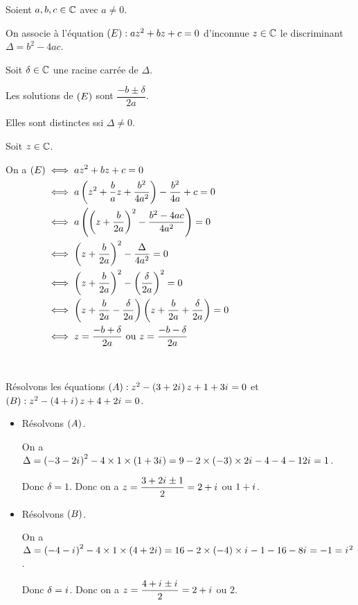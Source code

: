 \begin{prop}
Soient \(a,b,c\in\mathbb{C}\) avec \(a\not=0\).

On associe à l'équation \(\left(E\right):az^2+bz+c=0\) d'inconnue \(z\in\mathbb{C}\) le discriminant \(\Delta=b^2-4ac\).

Soit \(\delta\in\mathbb{C}\) une racine carrée de \(\Delta\).

Les solutions de \(\left(E\right)\) sont \(\dfrac{-b\pm\delta}{2a}\).

Elles sont distinctes ssi \(\Delta\not=0\).
\end{prop}

\begin{dem}
Soit \(z\in\mathbb{C}\).

On a \(\begin{aligned}[t]
\left(E\right)&\iff az^2+bz+c=0 \\
&\iff a\left(z^2+\dfrac{b}{a}z+\dfrac{b^2}{4a^2}\right)-\dfrac{b^2}{4a}+c=0 \\
&\iff a\left(\left(z+\dfrac{b}{2a}\right)^2-\dfrac{b^2-4ac}{4a^2}\right)=0 \\
&\iff\left(z+\dfrac{b}{2a}\right)^2-\dfrac{\Delta}{4a^2}=0 \\
&\iff\left(z+\dfrac{b}{2a}\right)^2-\left(\dfrac{\delta}{2a}\right)^2=0 \\
&\iff\left(z+\dfrac{b}{2a}-\dfrac{\delta}{2a}\right)\left(z+\dfrac{b}{2a}+\dfrac{\delta}{2a}\right)=0 \\
&\iff z=\dfrac{-b+\delta}{2a}\text{ ou }z=\dfrac{-b-\delta}{2a}
\end{aligned}\)

~
\end{dem}

\begin{ex}
Résolvons les équations \(\left(A\right):z^2-\left(3+2i\mkern1mu\right)z+1+3i\mkern1mu=0\) et \(\left(B\right):z^2-\left(4+i\mkern1mu\right)z+4+2i\mkern1mu=0\).

\begin{itemize}
\item Résolvons \(\left(A\right)\).

On a \(\Delta=\left(-3-2i\mkern1mu\right)^2-4\times1\times\left(1+3i\mkern1mu\right)=9-2\times\left(-3\right)\times2i\mkern1mu-4-4-12i\mkern1mu=1\).

Donc \(\delta=1\). Donc on a \(z=\dfrac{3+2i\mkern1mu\pm1}{2}=2+i\mkern1mu\) ou \(1+i\mkern1mu\).

\item Résolvons \(\left(B\right)\).

On a \(\Delta=\left(-4-i\mkern1mu\right)^2-4\times1\times\left(4+2i\mkern1mu\right)=16-2\times\left(-4\right)\times i\mkern1mu-1-16-8i\mkern1mu=-1=i\mkern1mu^2\).

Donc \(\delta=i\mkern1mu\). Donc on a \(z=\dfrac{4+i\mkern1mu\pm i\mkern1mu}{2}=2+i\mkern1mu\) ou \(2\).
\end{itemize}
\end{ex}

